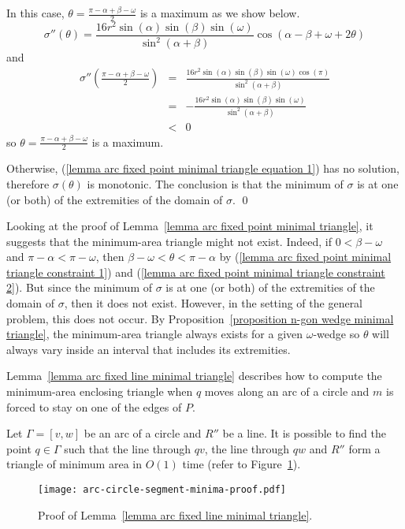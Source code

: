 \documentclass[11pt, oneside]{article}
\begin{document}
In this case,
$\theta = \frac{\pi-\alpha+\beta-\omega}{2}$ is a maximum as we show below.
$$\sigma''(\theta) = \frac{16r^2\sin(\alpha)\sin(\beta)\sin(\omega)}{\sin^2\!(\alpha+\beta)}\cos(\alpha-\beta+\omega+2\theta)$$
and
\begin{eqnarray*}
\sigma''\left( \frac{\pi-\alpha+\beta-\omega}{2} \right) &=& \frac{16r^2\sin(\alpha)\sin(\beta)\sin(\omega)\cos(\pi)}{\sin^2\!(\alpha+\beta)} \\
&=&-\frac{16r^2\sin(\alpha)\sin(\beta)\sin(\omega)}{\sin^2\!(\alpha+\beta)}\\
&<& 0
\end{eqnarray*}
so $\theta = \frac{\pi-\alpha+\beta-\omega}{2}$ is a maximum.

Otherwise,
(\ref{lemma arc fixed point minimal triangle equation 1}) has no solution,
therefore $\sigma(\theta)$ is monotonic.
The conclusion is that
the minimum of $\sigma$
is at one (or both) of the extremities
of the domain of $\sigma$.
\qed

Looking at the proof of Lemma~\ref{lemma arc fixed point minimal triangle},
it suggests that the minimum-area triangle might not exist.
Indeed,
if $0 < \beta-\omega$
and $\pi-\alpha < \pi-\omega$,
then $\beta-\omega < \theta < \pi-\alpha$
by (\ref{lemma arc fixed point minimal triangle constraint 1})
and (\ref{lemma arc fixed point minimal triangle constraint 2}).
But since the minimum of $\sigma$
is at one (or both) of the extremities
of the domain of $\sigma$,
then it does not exist.
However,
in the setting of the general problem,
this does not occur.
By Proposition~\ref{proposition n-gon wedge minimal triangle},
the minimum-area triangle always exists
for a given $\omega$-wedge
so $\theta$ will always vary inside an interval
that includes its extremities.

Lemma~\ref{lemma arc fixed line minimal triangle}
describes how to compute the minimum-area enclosing triangle
when $q$ moves along an arc of a circle
and $m$ is forced to stay on one of the edges of $P$.
\begin{lemma}
\label{lemma arc fixed line minimal triangle}
Let $\Gamma = [v,w]$ be an arc of a circle
and $R''$ be a line.
It is possible to find the point $q\in\Gamma$
such that the line through $qv$,
the line through $qw$
and $R''$
form a triangle of minimum area
in $O(1)$ time
(refer to Figure~\ref{arc-circle-segment-minima-proof}).
\begin{figure}
\centering
\texttt{[image: arc-circle-segment-minima-proof.pdf]}
\caption{Proof of Lemma~\ref{lemma arc fixed line minimal triangle}.\label{arc-circle-segment-minima-proof}}
\end{figure}
\end{lemma}
\end{document}
